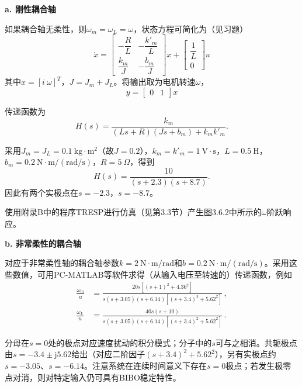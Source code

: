 \documentclass[12pt,a4paper]{ctexart}
\begin{document}
\textbf{a. 刚性耦合轴}

如果耦合轴无柔性，则$\omega_m=\omega_L=\omega$，状态方程可简化为（见习题）
\begin{equation}\label{eq:3.6.21}
\dot{x} = \begin{bmatrix} -\dfrac{R}{L} & -\dfrac{k'_m}{L} \\[4pt] \dfrac{k_m}{J} & -\dfrac{b_m}{J} \end{bmatrix}x + \begin{bmatrix} \dfrac{1}{L} \\[4pt] 0 \end{bmatrix}u
\end{equation}
其中$x = [i \ \omega]^T$，$J = J_m + J_L$。将输出取为电机转速$\omega$，
\begin{equation}\label{eq:3.6.22}
y = \begin{bmatrix} 0 & 1 \end{bmatrix}x
\end{equation}

传递函数为
\begin{equation}\label{eq:3.6.23}
H(s) = \frac{k_m}{(Ls+R)(Js+b_m) + k_m k'_m}.
\end{equation}

采用$J_m = J_L = 0.1\ \mathrm{kg\cdot m^2}$（故$J=0.2$），$k_m = k'_m = 1\ \mathrm{V\cdot s}$，$L = 0.5\ \mathrm{H}$，$b_m = 0.2\ \mathrm{N\cdot m/(rad/s)}$，$R = 5\ \Omega$，得到
\begin{equation}\label{eq:3.6.24}
H(s) = \frac{10}{(s+2.3)(s+8.7)}.
\end{equation}
因此有两个实极点在$s = -2.3$，$s = -8.7$。

使用附录B中的程序TRESP进行仿真（见第3.3节）产生图3.6.2中所示的$\omega$阶跃响应。

\textbf{b. 非常柔性的耦合轴}

对应于非常柔性轴的耦合轴参数$k = 2\ \mathrm{N\cdot m/rad}$和$b = 0.2\ \mathrm{N\cdot m/(rad/s)}$。采用这些数值，可用PC-MATLAB等软件求得（从输入电压至转速的）传递函数，例如
\begin{align}\label{eq:3.6.25}
\frac{\omega_m}{u} &= \frac{20s\left[(s+1)^2 + 4.36^2\right]}{s(s+3.05)(s+6.14)\left[(s+3.4)^2 + 5.62^2\right]}\,, \\[4pt]
\frac{\omega_L}{u} &= \frac{40s(s+10)}{s(s+3.05)(s+6.14)\left[(s+3.4)^2 + 5.62^2\right]}\,.
\end{align}

分母在$s=0$处的极点对应速度扰动的积分模式；分子中的$s$可与之相消。共轭极点由$s=-3.4\pm\mathrm{j}5.62$给出（对应二阶因子$(s+3.4)^2+5.62^2$），另有实极点约$s=-3.05$、$s=-6.14$。注意系统在连续时间意义下存在$s=0$极点；若发生极零点对消，则对特定输入仍可具有BIBO稳定特性。
\end{document}

